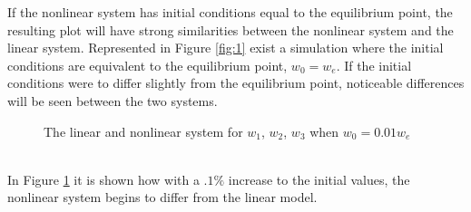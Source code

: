 \documentclass[12pt]{article}
\begin{document}
\clearpage
\vspace{5mm}
If the nonlinear system has initial conditions equal to the equilibrium point, the resulting plot will have strong similarities between the nonlinear system and the linear system. Represented in Figure \ref{fig:1} exist a simulation where the initial conditions are equivalent to the equilibrium point, $w_{0} = w_{e}$. If the initial conditions were to differ slightly from the equilibrium point, noticeable differences will be seen between the two systems. 
\begin{figure}[h!]
\centering
{}
\caption{The linear and nonlinear system for $w_{1}$, $w_{2}$, $w_{3}$ when $w_{0} = 0.01w_{e}$}
\label{fig:2}
\end{figure}
\\
In Figure \ref{fig:2} it is shown how with a $.1\%$ increase to the initial values, the nonlinear system begins to differ from the linear model.
\end{document}
